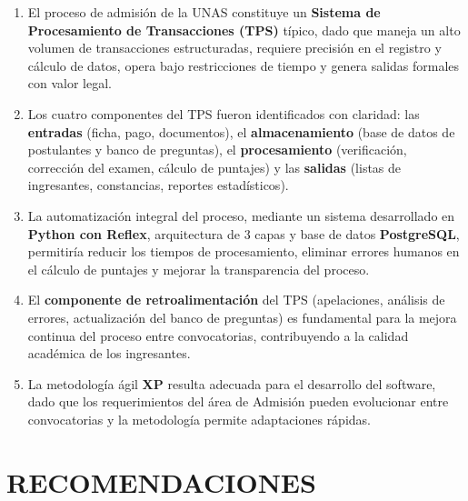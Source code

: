 \documentclass[12pt, a4paper]{report}
\begin{document}
\begin{enumerate}
  \item El proceso de admisión de la UNAS constituye un \textbf{Sistema de Procesamiento de Transacciones (TPS)} típico, dado que maneja un alto volumen de transacciones estructuradas, requiere precisión en el registro y cálculo de datos, opera bajo restricciones de tiempo y genera salidas formales con valor legal.

  \item Los cuatro componentes del TPS fueron identificados con claridad: las \textbf{entradas} (ficha, pago, documentos), el \textbf{almacenamiento} (base de datos de postulantes y banco de preguntas), el \textbf{procesamiento} (verificación, corrección del examen, cálculo de puntajes) y las \textbf{salidas} (listas de ingresantes, constancias, reportes estadísticos).

  \item La automatización integral del proceso, mediante un sistema desarrollado en \textbf{Python con Reflex}, arquitectura de 3 capas y base de datos \textbf{PostgreSQL}, permitiría reducir los tiempos de procesamiento, eliminar errores humanos en el cálculo de puntajes y mejorar la transparencia del proceso.

  \item El \textbf{componente de retroalimentación} del TPS (apelaciones, análisis de errores, actualización del banco de preguntas) es fundamental para la mejora continua del proceso entre convocatorias, contribuyendo a la calidad académica de los ingresantes.

  \item La metodología ágil \textbf{XP} resulta adecuada para el desarrollo del software, dado que los requerimientos del área de Admisión pueden evolucionar entre convocatorias y la metodología permite adaptaciones rápidas.
\end{enumerate}


\chapter*{RECOMENDACIONES}
\end{document}
